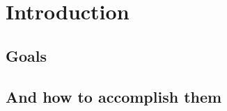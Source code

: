 \setcounter{page}{1}
%

\chapter{Introduction}
\label{chap:intro}



\section{Goals}



\section{And how to accomplish them}



